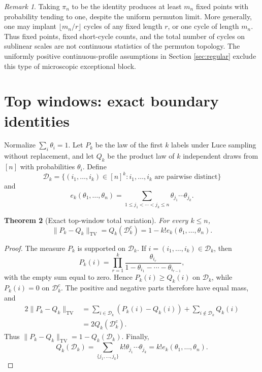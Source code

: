 \documentclass[11pt]{article}
\newtheorem{theorem}{Theorem}[section]
\theoremstyle{remark}
\newtheorem{remark}[theorem]{Remark}
\newcommand{\TV}{\mathrm{TV}}
\newcommand{\calD}{\mathcal D}
\begin{document}
\begin{remark}\label{rem:implantation-consequences}
Taking $\pi_n$ to be the identity produces at least $m_n$ fixed points with
probability tending to one, despite the uniform permuton limit.  More generally,
one may implant $\lfloor m_n/r\rfloor$ cycles of any fixed length $r$, or one
cycle of length $m_n$.  Thus fixed points, fixed short-cycle counts, and the
total number of cycles on sublinear scales are not continuous statistics of the
permuton topology.  The uniformly positive continuous-profile assumptions in
Section \ref{sec:regular} exclude this type of microscopic exceptional block.
\end{remark}

\section{Top windows: exact boundary identities}

Normalize \(\sum_i\theta_i=1\).  Let \(P_k\) be the law of the first
\(k\) labels under Luce sampling without replacement, and let \(Q_k\) be the
product law of \(k\) independent draws from \([n]\) with probabilities
\(\theta_i\).  Define
\[
 \calD_k=\{(i_1,\ldots,i_k)\in[n]^k:
 i_1,\ldots,i_k\text{ are pairwise distinct}\}
\]
and
\[
 e_k(\theta_1,\ldots,\theta_n)
 =\sum_{1\le j_1<\cdots<j_k\le n}
 \theta_{j_1}\cdots\theta_{j_k}.
\]

\begin{theorem}[Exact top-window total variation]\label{thm:top-tv}
For every \(k\le n\),
\[
        \|P_k-Q_k\|_{\TV}
        =Q_k(\calD_k^c)
        =1-k!e_k(\theta_1,\ldots,\theta_n).
\]
\end{theorem}

\begin{proof}
The measure \(P_k\) is supported on \(\calD_k\).  If \(i=(i_1,\ldots,i_k)\in\calD_k\), then
\[
        P_k(i)=\prod_{r=1}^k
        \frac{\theta_{i_r}}{1-\theta_{i_1}-\cdots-\theta_{i_{r-1}}},
\]
with the empty sum equal to zero.  Hence \(P_k(i)\ge Q_k(i)\) on \(\calD_k\), while \(P_k(i)=0\) on
\(\calD_k^c\).  The positive and negative parts therefore have equal mass, and
\[
\begin{aligned}
2\|P_k-Q_k\|_{\TV}
 &=\sum_{i\in\calD_k}(P_k(i)-Q_k(i))
   +\sum_{i\notin\calD_k}Q_k(i)\\
 &=2Q_k(\calD_k^c).
\end{aligned}
\]
Thus $\|P_k-Q_k\|_{\TV}=1-Q_k(\calD_k)$.
Finally,
\[
        Q_k(\calD_k)=\sum_{\{j_1,\ldots,j_k\}}
        k!\theta_{j_1}\cdots\theta_{j_k}=k!e_k(\theta_1,\ldots,\theta_n).
\]
\end{proof}
\end{document}
